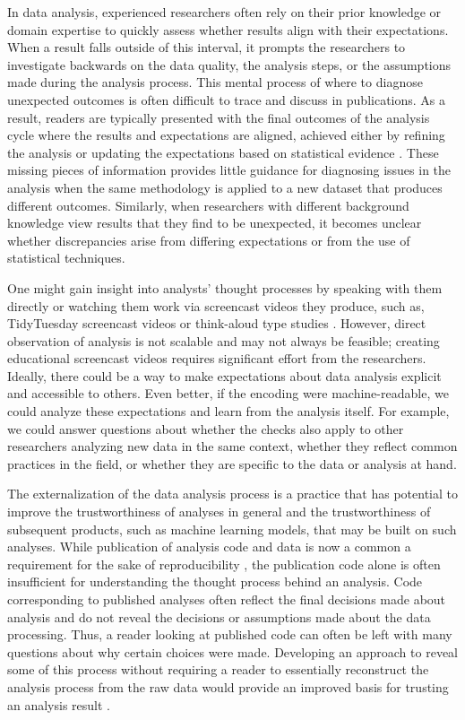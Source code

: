 \documentclass[
  12pt,
]{interact}
\begin{document}
In data analysis, experienced researchers often rely on their prior
knowledge or domain expertise to quickly assess whether results align
with their expectations. When a result falls outside of this interval,
it prompts the researchers to investigate backwards on the data quality,
the analysis steps, or the assumptions made during the analysis process.
This mental process of where to diagnose unexpected outcomes is often
difficult to trace and discuss in publications. As a result, readers are
typically presented with the final outcomes of the analysis cycle where
the results and expectations are aligned, achieved either by refining
the analysis or updating the expectations based on statistical evidence
\citep{grolemund_cognitive_2014}. These missing pieces of information
provides little guidance for diagnosing issues in the analysis when the
same methodology is applied to a new dataset that produces different
outcomes. Similarly, when researchers with different background
knowledge view results that they find to be unexpected, it becomes
unclear whether discrepancies arise from differing expectations or from
the use of statistical techniques.

One might gain insight into analysts' thought processes by speaking with
them directly or watching them work via screencast videos they produce,
such as, TidyTuesday screencast videos or think-aloud type studies
\citep[e.g.][]{gu2024data}. However, direct observation of analysis is
not scalable and may not always be feasible; creating educational
screencast videos requires significant effort from the researchers.
Ideally, there could be a way to make expectations about data analysis
explicit and accessible to others. Even better, if the encoding were
machine-readable, we could analyze these expectations and learn from the
analysis itself. For example, we could answer questions about whether
the checks also apply to other researchers analyzing new data in the
same context, whether they reflect common practices in the field, or
whether they are specific to the data or analysis at hand.

The externalization of the data analysis process is a practice that has
potential to improve the trustworthiness of analyses in general and the
trustworthiness of subsequent products, such as machine learning models,
that may be built on such analyses. While publication of analysis code
and data is now a common a requirement for the sake of reproducibility
\citep{peng2011reproducible}, the publication code alone is often
insufficient for understanding the thought process behind an analysis.
Code corresponding to published analyses often reflect the final
decisions made about analysis and do not reveal the decisions or
assumptions made about the data processing. Thus, a reader looking at
published code can often be left with many questions about why certain
choices were made. Developing an approach to reveal some of this process
without requiring a reader to essentially reconstruct the analysis
process from the raw data would provide an improved basis for trusting
an analysis result \citep{peng2021reproducible}.
\end{document}
